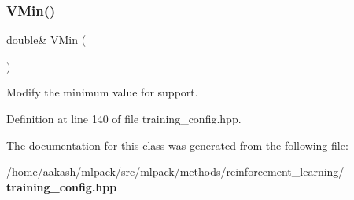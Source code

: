\subsubsection{V\+Min()\hspace{0.1cm}{\footnotesize\ttfamily [2/2]}}
{\footnotesize\ttfamily double\& V\+Min (\begin{DoxyParamCaption}{ }\end{DoxyParamCaption})\hspace{0.3cm}{\ttfamily [inline]}}



Modify the minimum value for support. 



Definition at line 140 of file training\+\_\+config.\+hpp.



The documentation for this class was generated from the following file\+:\begin{DoxyCompactItemize}
\item 
/home/aakash/mlpack/src/mlpack/methods/reinforcement\+\_\+learning/\textbf{ training\+\_\+config.\+hpp}\end{DoxyCompactItemize}
